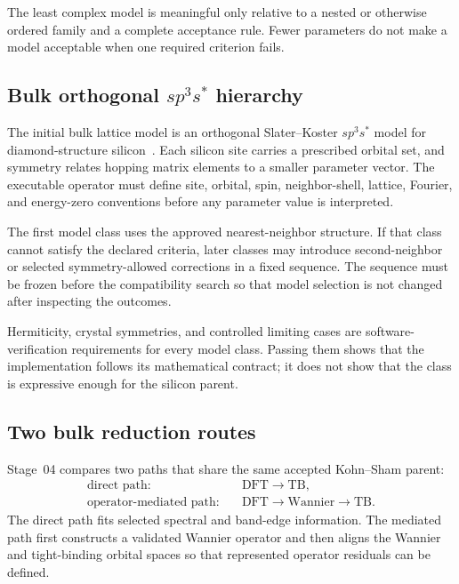 The least complex model is meaningful only relative to a nested or otherwise
ordered family and a complete acceptance rule. Fewer parameters do not make a
model acceptable when one required criterion fails.

\subsection{Bulk orthogonal \texorpdfstring{$sp^3s^{\ast}$}{sp3s*} hierarchy}


The initial bulk lattice model is an orthogonal Slater--Koster
$sp^3s^{\ast}$ model for diamond-structure
silicon~\cite{slater1954,vogl1983}. Each silicon site carries a
prescribed orbital set, and symmetry relates hopping matrix elements to a
smaller parameter vector. The executable operator must define site, orbital,
spin, neighbor-shell, lattice, Fourier, and energy-zero conventions before any
parameter value is interpreted.

The first model class uses the approved nearest-neighbor structure. If that
class cannot satisfy the declared criteria, later classes may introduce
second-neighbor or selected symmetry-allowed corrections in a fixed sequence.
The sequence must be frozen before the compatibility search so that model
selection is not changed after inspecting the outcomes.

Hermiticity, crystal symmetries, and controlled limiting cases are
software-verification requirements for every model class. Passing them shows
that the implementation follows its mathematical contract; it does not show
that the class is expressive enough for the silicon parent.

\subsection{Two bulk reduction routes}


Stage~04 compares two paths that share the same accepted Kohn--Sham parent:
\begin{align}
  \text{direct path:}\quad
  &\mathrm{DFT}\longrightarrow\mathrm{TB},\\
  \text{operator-mediated path:}\quad
  &\mathrm{DFT}\longrightarrow\mathrm{Wannier}
    \longrightarrow\mathrm{TB}.
\end{align}
The direct path fits selected spectral and band-edge information. The mediated
path first constructs a validated Wannier operator and then aligns the
Wannier and tight-binding orbital spaces so that represented operator residuals
can be defined.

